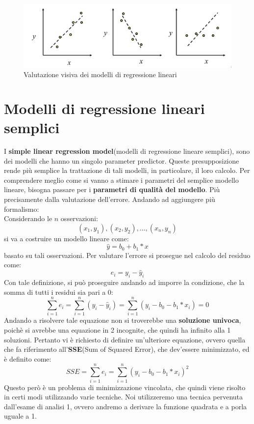 \begin{figure}[h]
\centering
\includegraphics[width=.7\textwidth]{img/chapter-5/quality-regression.png}
\caption{Valutazione visiva dei modelli di regressione lineari}\label{img:error-vision}
\end{figure}

\section{Modelli di regressione lineari semplici}
I \textbf{simple linear regression model}(modelli di regressione lineare semplici), sono dei modelli che hanno un singolo parameter predictor. Queste presupposizione rende più semplice la trattazione di tali modelli, in particolare, il loro calcolo. Per comprendere meglio come si vanno a stimare i parametri del semplice modello lineare, bisogna passare per i \textbf{parametri di qualità del modello}. Più precisamente dalla valutazione dell'errore.  
Andando ad aggiungere più formalismo:\\
Considerando le \(n\) osservazioni: 
    \[(x_1, y_1), (x_2, y_2), \dots, (x_n, y_n)\]
    si va a costruire un modello lineare come: 
    \[\hat{y} = b_0 + b_1*x\]
    basato su tali osservazioni. Per valutare l'errore si prosegue nel calcolo del residuo come:
    \[e_i = y_i - \hat{y}_i\]
Con tale definizione, si può proseguire andando ad imporre la condizione, che la somma di tutti i residui sia pari a 0:
\[
\sum_{i=1}^{n}e_i = \sum_{i=1}^{n}(y_i - \hat{y}_i)=\sum_{i=1}^{n}(y_i - b_0 - b_1*x_i) =  0
\]
Andando a risolvere tale equazione non si troverebbe una \textbf{soluzione univoca}, poichè si avrebbe una equazione in 2 incognite, che quindi ha infinito alla 1 soluzioni. Pertanto vi è richiesto di definire un'ulteriore equazione, ovvero quella che fa riferimento all'\textbf{SSE}(Sum of Squared Error), che dev'essere minimizzato, ed è definito come:
\[
SSE = \sum_{i=1}^{n}e_i = \sum_{i=1}^{n}(y_i - b_0 - b_1*x_i)^2
\]
Questo però è un problema di minimizzazione vincolata, che quindi viene risolto in certi modi utilizzando varie tecniche. Noi utilizzeremo una tecnica pervenuta dall'esame di analisi 1, ovvero andremo a derivare la funzione quadrata e a porla uguale a 1. 

